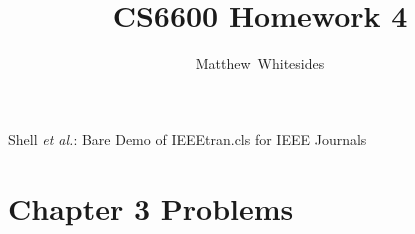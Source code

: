 \documentclass[journal,onecolumn]{IEEEtran}
\begin{document}
%
\title{CS6600 Homework 4}

%
%
%
\author{Matthew~Whitesides}%

%
{Shell \MakeLowercase{\textit{et al.}}: Bare Demo of IEEEtran.cls for IEEE Journals}

\maketitle


\IEEEpeerreviewmaketitle

\section{Chapter 3 Problems}
\end{document}
